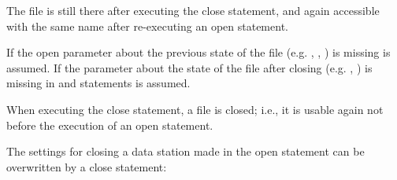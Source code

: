 \begin{itemize}
The file is still there after executing the close statement, and again
accessible with the same name after re-executing an open statement.
\end{itemize}


If the open parameter about the previous state of the file (e.g. , , )
is missing  is assumed.
If the parameter about the state of the file after closing (e.g. , )
is missing in  and  statements  is assumed.

When executing the close statement, a file is closed; i.e., it is
usable again not before the execution of an open statement.

\begin{grammarframe}

\end{grammarframe}

The settings for closing a data station made in the open statement can
be overwritten by a close statement:

\begin{grammarframe}

\end{grammarframe}

